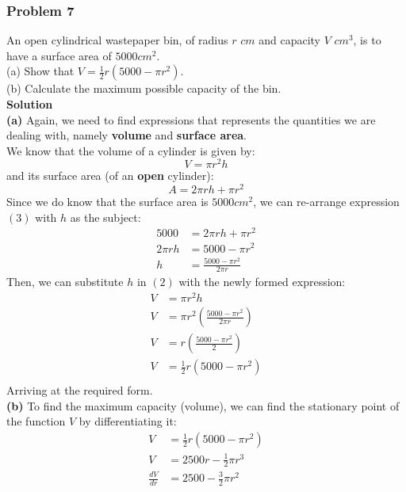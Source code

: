 \documentclass[hidelinks, a4paper, 12pt]{article}
\newcommand{\bd}{\textbf}
\newcommand{\n}{\\[\baselineskip]}
\begin{document}
            \subsubsection{Problem 7}
                An open cylindrical wastepaper bin, of radius $r$ $cm$ and capacity $V$ $cm^3$, is to have a surface area of $5000 cm^2$.\n
                (a) Show that $V = \frac{1}{2}r(5000-\pi r^2)$.\n
                (b) Calculate the maximum possible capacity of the bin.\n
                \bd{Solution}\n
                \bd{(a)} Again, we need to find expressions that represents the quantities we are dealing with, namely \bd{volume} and \bd{surface area}.\n
                We know that the volume of a cylinder is given by:
                \begin{equation}
                    V = \pi r^2h
                \end{equation}
                and its surface area (of an \bd{open} cylinder):
                \begin{equation}
                    A = 2\pi r h + \pi r^2
                \end{equation}
                Since we do know that the surface area is $5000cm^2$, we can re-arrange expression $(3)$ with $h$ as the subject:
                \[\begin{split}
                    5000 &= 2\pi r h + \pi r^2\\
                    2\pi r h &= 5000 - \pi r^2 \\
                    h &= \frac{5000 - \pi r^2}{2\pi r}
                \end{split}\]
                Then, we can substitute $h$ in $(2)$ with the newly formed expression:
                \[\begin{split}
                    V &= \pi r^2h\\
                    V &= \pi r^2 \left(\frac{5000 - \pi r^2}{2\pi r}\right)\\
                    V &= r \left(\frac{5000 - \pi r^2}{2}\right)\\
                    V &= \frac{1}{2}r(5000 - \pi r^2)\\
                \end{split}\]
                Arriving at the required form.\n
                \bd{(b)} To find the maximum capacity (volume), we can find the stationary point of the function $V$ by differentiating it:
                \[\begin{split}
                    V &= \frac{1}{2}r(5000 - \pi r^2)\\
                    V &= 2500r - \frac{1}{2}\pi r^3\\
                    \frac{dV}{dr} &= 2500 - \frac{3}{2}\pi r^2
                \end{split}\]
\end{document}
